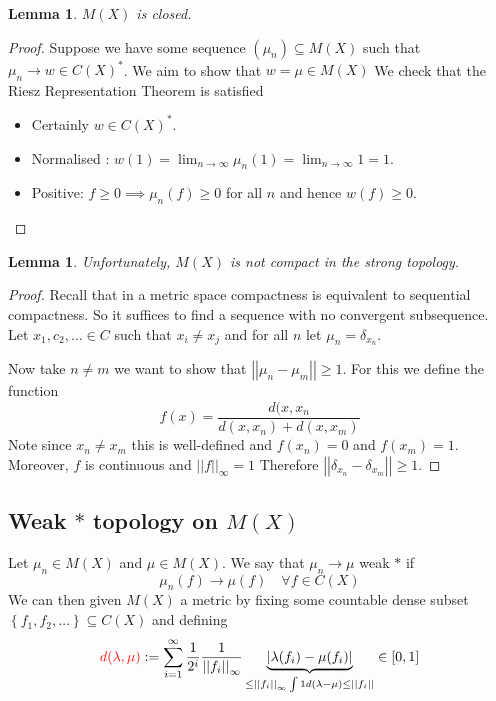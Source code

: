 \documentclass[11pt]{article}
\newcommand{\defeq}{:=}
\newcommand{\abs}[1]{\left|#1\right|}
\newcommand{\norm}[1]{\left|\left|#1\right|\right|}
\newenvironment{defin}
	{\begin{mdframed}[backgroundcolor=white, roundcorner=5pt, linewidth=1pt]}
	{\end{mdframed}}
\newcommand{\mdf}[1]{{\color{red} #1}}
\newtheorem{lemma}[prop]{Lemma}
\begin{document}
\begin{lemma}
$M(X)$ is closed.
\end{lemma}

\begin{proof}
Suppose we have some sequence $(\mu_n)\subseteq M(X)$ such that $\mu_n\to w\in C(X)^\ast$.
We aim to show that $w=\mu\in M(X)$
We check that the Riesz Representation Theorem is satisfied
\begin{itemize}
	\item Certainly $w\in C(X)^\ast$.
	\item Normalised : $w(1)=\lim_{n\to\infty}\mu_n(1) = \lim_{n\to\infty}1=1$.
	\item Positive: $f\geq 0 \implies \mu_n(f)\geq 0$ for all $n$ and hence $w(f)\geq 0$.
\end{itemize}
\end{proof}

\begin{lemma}
Unfortunately, $M(X)$ is not compact in the strong topology.
\end{lemma}
\begin{proof}
Recall that in a metric space compactness is equivalent to sequential compactness.
So it suffices to find a sequence with no convergent subsequence.
Let $x_1, c_2, \dots \in C$ such that $x_i\neq x_j$ and for all $n$ let $\mu_n=\delta_{x_n}$.

Now take $n\neq m$ we want to show that $\norm{\mu_n - \mu_m} \geq 1$.
For this we define the function 
\[
	f(x)=\frac{d(x, x_n}{d(x, x_n) + d(x, x_m)}
\]
Note since $x_n\neq x_m$ this is well-defined and $f(x_n)=0$ and $f(x_m)=1$.
Moreover, $f$ is continuous and $\norm{f}_\infty = 1$
Therefore $\norm{\delta_{x_n}-\delta_{x_m}}\geq 1$.
\end{proof}

\subsection{Weak $\ast$ topology on $M(X)$}
\begin{defin}
	Let $\mu_n\in M(X)$ and $\mu\in M(X)$.
	We say that $\mu_n\to\mu$ \mdf{weak $\ast$} if
	\[
		\mu_n(f)\to\mu(f) \quad \forall f\in C(X)
	\]
	We can then given $M(X)$ a metric by fixing some countable dense subset $\left\{ f_1, f_2, \dots \right\}\subseteq C(X)$ and defining
	\[
		\mdf{d(\lambda, \mu)}\defeq \sum_{i=1}^{\infty}\frac{1}{2^i}\frac{1}{\norm{f_i}_\infty}\underbrace{\abs{\lambda(f_i)-\mu(f_i)}}_{\leq\norm{f_i}_\infty \int 1 d(\lambda - \mu) \leq \norm{f_i}}\in [0, 1]
	\]
\end{defin}
\end{document}
